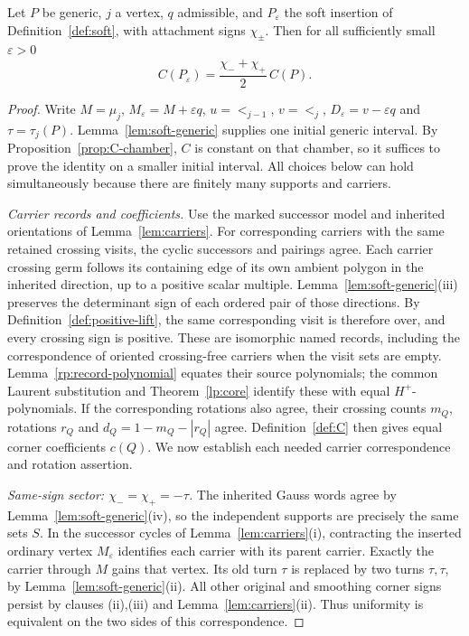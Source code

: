 \begin{theorem}\label{thm:C-soft}\leanok
Let $P$ be generic, $j$ a vertex, $q$ admissible, and $P_\varepsilon$ the
soft insertion of Definition~\ref{def:soft}, with attachment signs
$\chi_\pm$. Then for all sufficiently small $\varepsilon>0$
\[
C(P_\varepsilon)=\frac{\chi_-+\chi_+}{2}\,C(P).
\]

\end{theorem}
\begin{proof}\leanok{}
Write $M=\mu_j$, $M_\varepsilon=M+\varepsilon q$,
$u=\lt_{j-1}$, $v=\lt_j$, $D_\varepsilon=v-\varepsilon q$
and $\tau=\tau_j(P)$. Lemma~\ref{lem:soft-generic} supplies
one initial generic interval. By Proposition~\ref{prop:C-chamber},
$C$ is constant on that chamber, so it suffices to prove the identity
on a smaller initial interval. All choices below can hold
simultaneously because there are finitely many supports and carriers.

\emph{Carrier records and coefficients.}
Use the marked successor model and inherited orientations of
Lemma~\ref{lem:carriers}. For corresponding carriers with the same
retained crossing visits, the cyclic successors and pairings agree.
Each carrier crossing germ follows its containing edge of its own
ambient polygon in the inherited direction, up to a positive scalar
multiple.
Lemma~\ref{lem:soft-generic}(iii) preserves the determinant sign
of each ordered pair of those directions. By
Definition~\ref{def:positive-lift}, the same corresponding visit
is therefore over, and every crossing sign is positive. These
are isomorphic named records, including the correspondence of
oriented crossing-free carriers when the visit sets are empty.
Lemma~\ref{rp:record-polynomial} equates their source polynomials;
the common Laurent substitution and Theorem~\ref{lp:core} identify
these with equal $H^+$-polynomials. If the corresponding rotations
also agree, their crossing counts $m_Q$, rotations $r_Q$ and
$d_Q=1-m_Q-|r_Q|$ agree. Definition~\ref{def:C} then gives equal
corner coefficients $c(Q)$. We now establish each needed carrier
correspondence and rotation assertion.

\emph{Same-sign sector: $\chi_-=\chi_+=-\tau$.}
The inherited Gauss words agree by Lemma~\ref{lem:soft-generic}(iv),
so the independent supports are precisely the same sets $S$.
In the successor cycles of Lemma~\ref{lem:carriers}(i), contracting
the inserted ordinary vertex $M_\varepsilon$ identifies each
carrier with its parent carrier. Exactly the carrier through $M$
gains that vertex. Its old turn $\tau$ is replaced by two turns
$\tau,\tau$, by Lemma~\ref{lem:soft-generic}(ii). All other
original and smoothing corner signs persist by clauses (ii),(iii)
and Lemma~\ref{lem:carriers}(ii). Thus uniformity is equivalent
on the two sides of this correspondence.


\end{proof}

